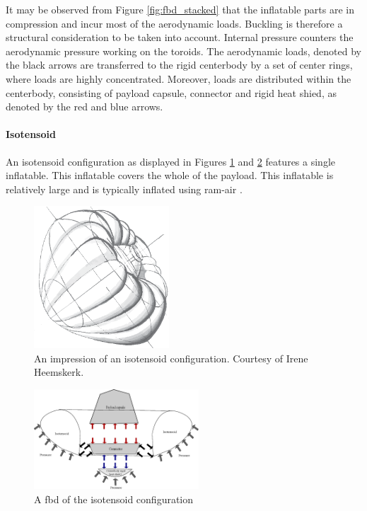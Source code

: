 It may be observed from Figure  \ref{fig:fbd_stacked} that the inflatable parts are in compression and incur most of the aerodynamic loads. Buckling is therefore a structural consideration to be taken into account. Internal pressure counters the aerodynamic pressure working on the toroids. The aerodynamic loads, denoted by the black arrows are transferred to the rigid centerbody by a set of center rings, where loads are highly concentrated. Moreover, loads are distributed within the centerbody, consisting of payload capsule, connector and rigid heat shied, as denoted by the red and blue arrows.


\paragraph{Isotensoid}

An isotensoid configuration as displayed in Figures \ref{fig:conc_iso} and \ref{fig:fbd_iso} features a single inflatable. This inflatable covers the whole of the payload. This inflatable is relatively large and is typically inflated using ram-air \cite{Smith2011}. 

\begin{figure}[H]
\centering
\includegraphics[width = 0.45\textwidth]{Figure/isotensoid.eps}

\caption{An impression of an isotensoid configuration. Courtesy of Irene Heemskerk.}

\label{fig:conc_iso}
\end{figure}

\begin{figure}[H]
\centering
\includegraphics[width = 0.55\textwidth]{Figure/FBD_isotensoid.eps}
\caption{A \gls{fbd} of the isotensoid configuration}
\label{fig:fbd_iso}
\end{figure}

